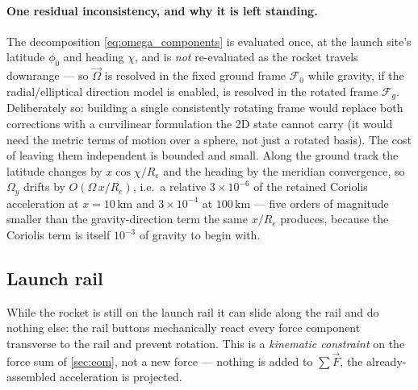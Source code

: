 \paragraph{One residual inconsistency, and why it is left standing.} The decomposition
\autoref{eq:omega_components} is evaluated once, at the launch site's latitude $\phi_0$ and
heading $\chi$, and is \emph{not} re-evaluated as the rocket travels downrange --- so
$\vec{\Omega}$ is resolved in the fixed ground frame $\mathcal{F}_0$ while gravity, if the
radial/elliptical direction model is enabled, is resolved in the rotated frame $\mathcal{F}_g$.
Deliberately so: building a single consistently rotating frame would replace both corrections with
a curvilinear formulation the 2D state cannot carry (it would need the metric terms of motion over
a sphere, not just a rotated basis). The cost of leaving them independent is bounded and small.
Along the ground track the latitude changes by $x\cos\chi/R_e$ and the heading by the meridian
convergence, so $\Omega_y$ drifts by $O(\Omega\,x/R_e)$, i.e.\ a relative $3\times10^{-6}$ of the
retained Coriolis acceleration at $x=10\,\mathrm{km}$ and $3\times10^{-4}$ at $100\,\mathrm{km}$
--- five orders of magnitude smaller than the gravity-direction term the same $x/R_e$ produces,
because the Coriolis term is itself $10^{-3}$ of gravity to begin with.

\subsection{Launch rail}\label{sec:rail}
While the rocket is still on the launch rail it can slide along the rail and do nothing else: the
rail buttons mechanically react every force component transverse to the rail and prevent rotation.
This is a \emph{kinematic constraint} on the force sum of \autoref{sec:eom}, not a new force ---
nothing is added to $\sum\vec{F}$, the already-assembled acceleration is projected.

